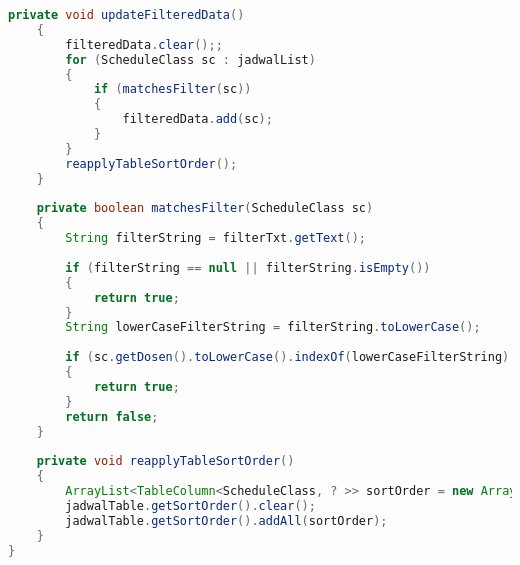 \begin{lstlisting}[language=Java,basicstyle=\tiny,caption=FXMLDocumentController.java,label=lst:FXMLDocumentController]
    private void updateFilteredData()
    {
        filteredData.clear();;       
        for (ScheduleClass sc : jadwalList)
        {
            if (matchesFilter(sc))
            {
                filteredData.add(sc);
            }
        }       
        reapplyTableSortOrder();
    }
    
    private boolean matchesFilter(ScheduleClass sc)
    {
        String filterString = filterTxt.getText();
        
        if (filterString == null || filterString.isEmpty())
        {
            return true;
        }     
        String lowerCaseFilterString = filterString.toLowerCase();
        
        if (sc.getDosen().toLowerCase().indexOf(lowerCaseFilterString) != -1)
        {
            return true;
        }
        return false;
    }
    
    private void reapplyTableSortOrder()
    {
        ArrayList<TableColumn<ScheduleClass, ? >> sortOrder = new ArrayList<>(jadwalTable.getSortOrder());
        jadwalTable.getSortOrder().clear();
        jadwalTable.getSortOrder().addAll(sortOrder);
    }   
}

\end{lstlisting}